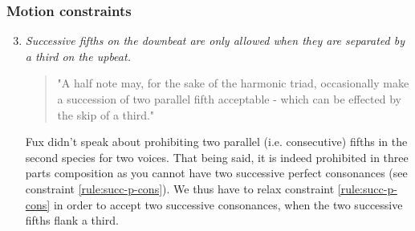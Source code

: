 \subsubsection{Motion constraints}
\begin{enumerate}[wide, label=\bfseries 2.P\arabic*]
\setcounter{enumi}{2} 
    \item \textit{Successive fifths on the downbeat are only allowed when they are separated by a third on the upbeat.} \label{rule:succ-fifths-flanking-third}    
    \begin{quotation}
        "A half note may, for the sake of the harmonic triad, occasionally make a succession of two parallel fifth acceptable - which can be effected by the skip of a third."
        \textcite[p.86]{GaPEng}
    \end{quotation}
    Fux didn't speak about prohibiting two parallel (i.e. consecutive) fifths in the second species for two voices. That being said, it is indeed prohibited in three parts composition as you cannot have two successive perfect consonances (see constraint \ref{rule:succ-p-cons}). We thus have to relax constraint \ref{rule:succ-p-cons} in order to accept two successive consonances, when the two successive fifths flank a third.


\end{enumerate}
